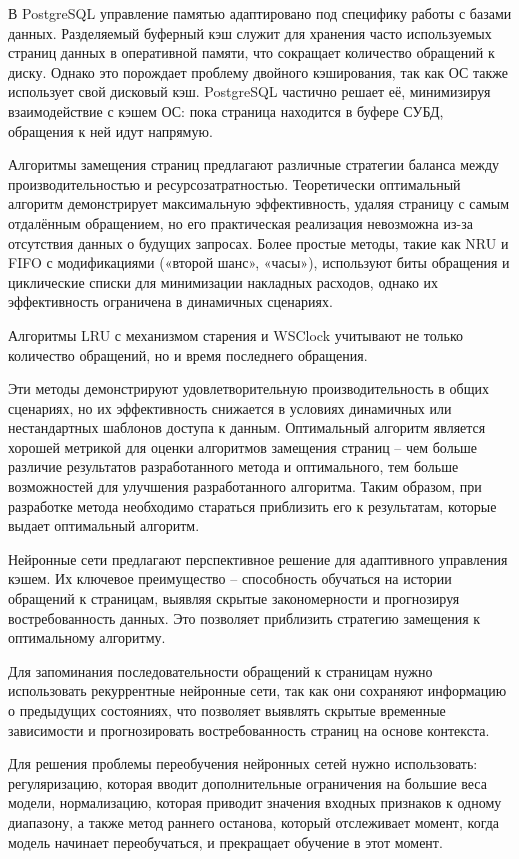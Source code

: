 В PostgreSQL управление памятью адаптировано под специфику работы с базами данных. 
Разделяемый буферный кэш служит для хранения часто используемых страниц данных в оперативной памяти, что сокращает количество обращений к диску.
Однако это порождает проблему двойного кэширования, так как ОС также использует свой дисковый кэш.
PostgreSQL частично решает её, минимизируя взаимодействие с кэшем ОС: пока страница находится в буфере СУБД, обращения к ней идут напрямую.

Алгоритмы замещения страниц предлагают различные стратегии баланса между производительностью и ресурсозатратностью.
Теоретически оптимальный алгоритм демонстрирует максимальную эффективность, удаляя страницу с самым отдалённым обращением, но его практическая реализация невозможна из-за отсутствия данных о будущих запросах. 
Более простые методы, такие как NRU и FIFO с модификациями («второй шанс», «часы»), используют биты обращения и циклические списки для минимизации накладных расходов, однако их эффективность ограничена в динамичных сценариях.

Алгоритмы LRU с механизмом старения и WSClock учитывают не только количество обращений, но и время последнего обращения.

Эти методы демонстрируют удовлетворительную производительность в общих сценариях, но их эффективность снижается в условиях динамичных или нестандартных шаблонов доступа к данным.
Оптимальный алгоритм является хорошей метрикой для оценки алгоритмов замещения страниц -- чем больше различие результатов разработанного метода и оптимального, тем больше возможностей для улучшения разработанного алгоритма.
Таким образом, при разработке метода необходимо стараться приблизить его к результатам, которые выдает оптимальный алгоритм.

Нейронные сети предлагают перспективное решение для адаптивного управления кэшем.
Их ключевое преимущество -- способность обучаться на истории обращений к страницам, выявляя скрытые закономерности и прогнозируя востребованность данных. 
Это позволяет приблизить стратегию замещения к оптимальному алгоритму. 

Для запоминания последовательности обращений к страницам нужно использовать рекуррентные нейронные сети, так как они сохраняют информацию о предыдущих состояниях, что позволяет выявлять скрытые временные зависимости и прогнозировать востребованность страниц на основе контекста.

Для решения проблемы переобучения нейронных сетей нужно использовать: регуляризацию, которая вводит дополнительные ограничения на большие веса модели, нормализацию, которая приводит значения входных признаков к одному диапазону, а также метод раннего останова, который отслеживает момент, когда модель начинает переобучаться, и прекращает обучение в этот момент.
